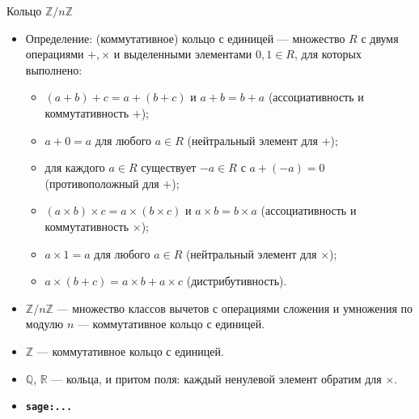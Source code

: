 \documentclass[serif, aspectratio=169]{beamer}
\newcommand{\sagemark}{%
  \textcolor{green!40!black}{\textbf{\texttt{sage:...}}}%
}
\begin{document}
\begin{frame}{Кольцо $\mathbb{Z}/n\mathbb{Z}$}
    \begin{itemize}
        \item Определение: (коммутативное) кольцо с единицей --- множество $R$ с двумя операциями $+,\times$ и выделенными элементами $0,1\in R$, для которых выполнено:
        \begin{itemize}
            \item $(a+b)+c=a+(b+c)$ и $a+b=b+a$ (ассоциативность и коммутативность $+$);
            \item $a+0=a$ для любого $a\in R$ (нейтральный элемент для $+$);
            \item для каждого $a\in R$ существует $-a\in R$ с $a+(-a)=0$ (противоположный для $+$);
            \item $(a\times b)\times c=a\times(b\times c)$ и $a\times b=b\times a$ (ассоциативность и коммутативность $\times$);
            \item $a\times1=a$ для любого $a\in R$ (нейтральный элемент для $\times$);
            \item $a\times(b+c)=a\times b+a\times c$ (дистрибутивность).
        \end{itemize}
        \item $\mathbb{Z}/n\mathbb{Z}$ --- множество классов вычетов с операциями сложения и умножения по модулю $n$ --- коммутативное кольцо с единицей.
        \item $\mathbb{Z}$ --- коммутативное кольцо с единицей.
        \item $\mathbb{Q}$, $\mathbb{R}$ --- кольца, и притом поля: каждый ненулевой элемент обратим для $\times$.
        \item \sagemark
    \end{itemize}
\end{frame}
\end{document}
